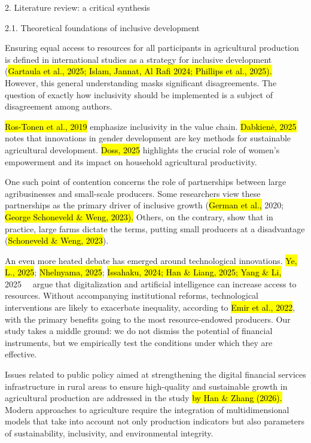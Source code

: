\documentclass[
]{article}
\begin{document}
2. Literature review: a critical synthesis

2.1. Theoretical foundations of inclusive development

Ensuring equal access to resources for all participants in agricultural
production is defined in international studies as a strategy for
inclusive development (\hl{Gartaula et al., 2025; Islam, Jannat, Al Rafi
2024; Phillips et al., 2025).} However, this general understanding masks
significant disagreements. The question of exactly how inclusivity
should be implemented is a subject of disagreement among authors.

\hl{Ros-Tonen et al., 2019} emphasize inclusivity in the value chain.
\hl{Dabkienė, 2025} notes that innovations in gender development are key
methods for sustainable agricultural development. \hl{Doss, 2025}
highlights the crucial role of women's empowerment and its impact on
household agricultural productivity.

One such point of contention concerns the role of partnerships between
large agribusinesses and small-scale producers. Some researchers view
these partnerships as the primary driver of inclusive growth (\hl{German
et al.,} 2020; \hl{George Schoneveld \& Weng, 2023).} Others, on the
contrary, show that in practice, large farms dictate the terms, putting
small producers at a disadvantage (\hl{Schoneveld \& Weng, 2023}).

An even more heated debate has emerged around technological innovations.
\hl{Ye, L., 2025}; \hl{Nhelnyama, 2025}; \hl{Issahaku, 2024; Han \&
Liang, 2025; Yang \& Li,} 2025~~ argue that digitalization and
artificial intelligence can increase access to resources. Without
accompanying institutional reforms, technological interventions are
likely to exacerbate inequality, according to \hl{Emir et al., 2022},
with the primary benefits going to the most resource-endowed producers.
Our study takes a middle ground: we do not dismiss the potential of
financial instruments, but we empirically test the conditions under
which they are effective.

Issues related to public policy aimed at strengthening the digital
financial services infrastructure in rural areas to ensure high-quality
and sustainable growth in agricultural production are addressed in the
study \hl{by Han \& Zhang (2026).} Modern approaches to agriculture
require the integration of multidimensional models that take into
account not only production indicators but also parameters of
sustainability, inclusivity, and environmental integrity.
\end{document}
